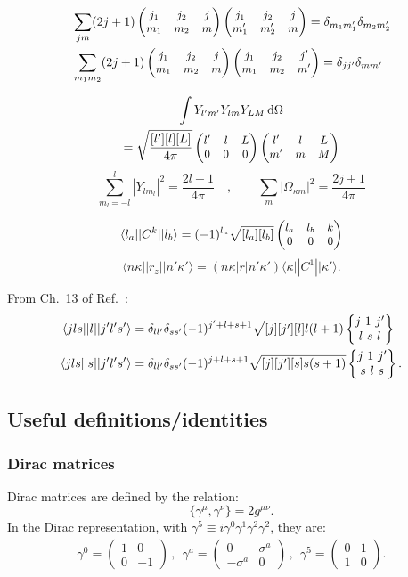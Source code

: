 \documentclass[10pt,twocolumn,a4paper]{article}%
\newcommand{\bra}[1]{\ensuremath{\langle #1|}}	%
\newcommand{\ket}[1]{\ensuremath{|#1\rangle}}	%
\newcommand{\matr}[4]{\ensuremath{\begin{pmatrix}#1&#2\\#3&#4\end{pmatrix}}}	%
\newcommand{\threej}[6]{\small\ensuremath{\begin{pmatrix}#1&#2&#3\\#4&#5&#6\end{pmatrix}}}	%
\newcommand{\sixjs}[6]{\ensuremath{\begin{Bmatrix}#1~#2~#3\\#4~#5~#6\end{Bmatrix}}}	%
\newcommand{\be}{\begin{equation}}
\newcommand{\ee}{\end{equation}}
\def\d{\ensuremath{{\rm d}}}
\newcommand{\g}{\ensuremath{\gamma}}
\newcommand{\s}{\ensuremath{\sigma}}
\renewcommand{\k}{\ensuremath{\kappa}}
\begin{document}
\begin{align}\notag
&\sum_{jm}(2j+1)\threej{j_1}{j_2}{j}{m_1}{m_2}{m}\threej{j_1}{j_2}{j}{m_1'}{m_2'}{m} = \delta_{m_1m_1'}\delta_{m_2m_2'}
\\
&\sum_{m_1m_2}(2j+1)\threej{j_1}{j_2}{j}{m_1}{m_2}{m}\threej{j_1}{j_2}{j'}{m_1}{m_2}{m'} = \delta_{jj'}\delta_{mm'}
\end{align}

\begin{multline}
\int Y_{l'm'}Y_{lm}Y_{LM}\,\d \Omega \\= \sqrt{\frac{[l'][l][L]}{4\pi}}\threej{l'}{l}{L}{0}{0}{0}\threej{l'}{l}{L}{m'}{m}{M}
\end{multline}
\be
\sum_{m_l=-l}^l |Y_{lm_l}|^2 = \frac{2l+1}{4\pi}\quad,\qquad \sum_m |\Omega_{\k m}|^2 = \frac{2j+1}{4\pi}
\ee

\be
\bra{l_a}|C^k|\ket{l_b} = (-1)^{l_a}\sqrt{[l_a][l_b]}\threej{l_a}{l_b}{k}{0}{0}{0}
\ee
%
\be
\bra{n\k}|r_z|\ket{n'\k'} = ({n\k}|r|{n'\k'})\bra{\k}|C^1|\ket{\k'}.
\ee



From Ch.~13 of Ref.~\cite{Varshalovich1988}:
\begin{align}\notag
\bra{jls}|l|\ket{j'l's'}& =\delta_{ll'}\delta_{ss'}(-1)^{j'+l+s+1}\sqrt{[j][j'][l]l(l+1)}\sixjs{j}{1}{j'}{l}{s}{l}\\
\bra{jls}|s|\ket{j'l's'}&= \delta_{ll'}\delta_{ss'}(-1)^{j+l+s+1}\sqrt{[j][j'][s]s(s+1)}\sixjs{j}{1}{j'}{s}{l}{s}.
\end{align}




\subsection{Useful definitions/identities}

\subsubsection*{Dirac matrices}\label{sec:DiracMatrix}

Dirac matrices are defined by the relation:
\be
\{\g^\mu,\g^\nu\} = 2g^{\mu\nu}.
\ee
In the Dirac representation, with $\g^5 \equiv i\g^0\g^1\g^2\g^2$, they are:
\begin{multline}
\g^0 = \matr{1}{0}{0}{-1} \, , ~~
\g^a = \matr{0}{\s^a}{-\s^a}{0} \, , ~~
\g^5 = \matr{0}{1}{1}{0}.
\end{multline}
\end{document}
